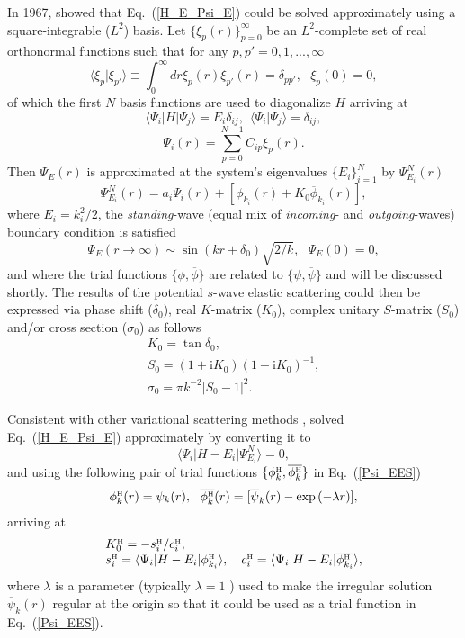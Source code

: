 \documentclass[aip
, pra
, showpacs
, aps
, twocolumn
, groupedaddress
, floatfix
]{revtex4}
\newcommand{\beq}{\begin{equation}}
\newcommand{\eeq}{\end{equation}}
\newcommand{\barr}{\begin{array}}
\newcommand{\earr}{\end{array}}
\newcommand{\phiH}{\phi^{\mbox{\tiny{H}}}}
\begin{document}
In 1967, \citet{Harris67} showed that Eq.~(\ref{H_E_Psi_E}) could be solved
approximately using a square-integrable ($L^2$) basis.
Let $\{\xi_p(r)\}_{p=0}^\infty$ be an $L^2$-complete set of real orthonormal functions
such that for any $p,p'=0,1,...,\infty$
\beq
\langle \xi_p | \xi_{p'} \rangle \equiv \int_0^\infty dr \xi_p(r) \xi_{p'}(r) =\delta_{pp'}, \ \ \ \xi_p(0)=0,
\eeq
of which the first $N$ basis functions are used to diagonalize $H$ arriving at
\beq
\langle \Psi_i |H| \Psi_j \rangle = E_i \delta_{ij} , \ \ \langle \Psi_i | \Psi_j \rangle=\delta_{ij},
\eeq
\beq
\Psi_i(r) = \sum_{p=0}^{N-1} C_{ip} \xi_p(r).
\eeq
Then $\Psi_E(r)$ is approximated at the system's eigenvalues $\{E_i\}_{i=1}^{N}$ by $\Psi^N_{E_i}(r)$
\cite{Harris67}
\beq
\Psi^N_{E_i}(r) = a_i \Psi_i(r)  + [\phi_{k_i}(r)  + K_{0} \overline{\phi}_{k_i}(r)],
\label{Psi_EES} \eeq
where $E_i=k_i^2/2$, the {\em standing}-wave (equal mix of {\em incoming}- and {\em outgoing}-waves) boundary condition is satisfied
\beq
\Psi_E(r \rightarrow \infty) \sim  \sin(kr+\delta_0) \sqrt{2/k}, \ \ \ \Psi_E(0)=0,   \label{stand_wave}
\eeq
and where the trial functions $\{\phi,\overline{\phi}\}$ are related to $\{\psi,\overline{\psi}\}$ and will be discussed shortly.
The results of the potential $s$-wave elastic scattering could then be expressed via
phase shift ($\delta_0$), real $K$-matrix ($K_0$), complex unitary $S$-matrix ($S_{0}$) and/or cross section ($\sigma_{0}$)
as follows
\beq \barr{l}
K_{0} = \tan{\delta_0},\\
S_{0}=(1+\mbox{i}K_0)(1-\mbox{i}K_0)^{-1}, \\
\sigma_{0}=\pi k^{-2} |S_{0}-1|^2.
\earr \eeq


Consistent with other variational scattering methods \cite{Nesbet68},
\citet{Harris67} solved Eq.~(\ref{H_E_Psi_E}) approximately by converting it to
\beq
\langle\Psi_i|H-E_i|\Psi^N_{E_i}\rangle=0,  \label{EES_ONE_C1}
\eeq
and using the following pair of trial functions $\{\phiH_k, \overline{\phiH_{k}} \}$ in
Eq.~(\ref{Psi_EES})
\beq \barr{l}
\phiH_k(r) =  \psi_k(r),\ \
\overline{\phiH_k}(r) =  [\overline{\psi}_k(r) - \exp{(-\lambda r)}],
\earr \label{def_phi_H} \eeq
arriving at
\beq \barr{l}
K^{\mbox{\tiny{H}}}_{0} = - s^{\mbox{\tiny{H}}}_i / c^{\mbox{\tiny{H}}}_i, \\
s^{\mbox{\tiny{H}}}_i = \langle\Psi_i|H-E_i|  \phiH_{k_i} \rangle, \ \ \
c^{\mbox{\tiny{H}}}_i = \langle\Psi_i|H-E_i|  \overline{\phiH_{k_i}} \rangle,
\earr \label{K_0_Harris} \eeq
where $\lambda$ is a parameter (typically $\lambda=1$ \cite{Nesbet68}) used to make the irregular solution $\overline{\psi}_k(r)$ regular
at the origin so that it could be used as a trial function in Eq.~(\ref{Psi_EES}).
\end{document}
